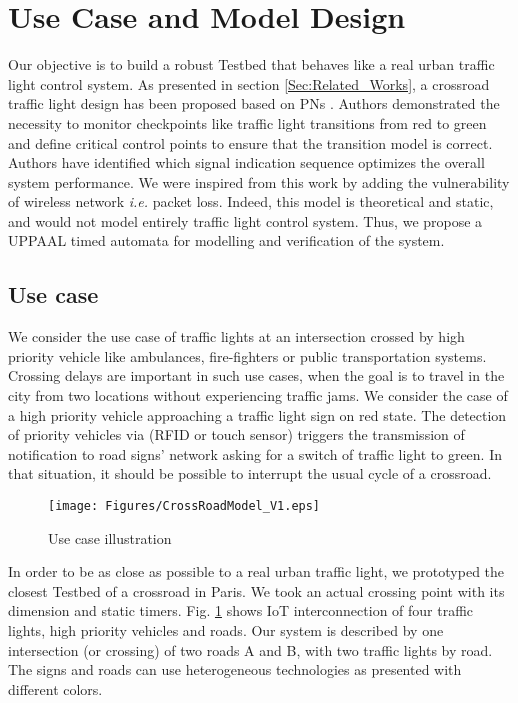 \section{Use Case and Model Design} \label{sec:Approach}

Our objective is to build a robust Testbed that behaves like a real urban traffic light control system.
As presented in section \ref{Sec:Related_Works},
	a crossroad traffic light design has been proposed based on PNs \cite{huang_modular_2014}.
Authors demonstrated the necessity to monitor checkpoints like traffic light transitions from red to green and define critical control points to ensure that the transition model is correct.
Authors have identified which signal indication sequence optimizes the overall system performance.
We were inspired from this work by adding the vulnerability of wireless network \emph{i.e.} packet loss.
Indeed,
	this model is theoretical and static,
	and would not model entirely traffic light control system.
Thus,
	we propose a UPPAAL timed automata for modelling and verification of the system.

\subsection{Use case}

We consider the use case of traffic lights at an intersection crossed by high priority vehicle like ambulances,
	fire-fighters or public transportation systems.
Crossing delays are important in such use cases,
	when the goal is to travel in the city from two locations without experiencing traffic jams.
We consider the case of a high priority vehicle approaching a traffic light sign on red state.
The detection of priority vehicles via (RFID or touch sensor) triggers the transmission of notification to road signs' network asking for a switch of traffic light to green.
In that situation,
	it should be possible to interrupt the usual cycle of a crossroad.

\begin{figure}[!htb]
\centering
\texttt{[image: Figures/CrossRoadModel\_V1.eps]}
\caption{Use case illustration}
\label{fig:CrossRoadModel.eps}
\end{figure}

In order to be as close as possible to a real urban traffic light,
	we prototyped the closest Testbed of a crossroad in Paris.
We took an actual crossing point with its dimension and static timers.
Fig.
\ref{fig:CrossRoadModel.eps} shows IoT interconnection of four traffic lights,
	high priority vehicles and roads.
Our system is described by one intersection (or crossing) of two roads A and B,
	with two traffic lights by road.
The signs and roads can use heterogeneous technologies as presented with different colors.

